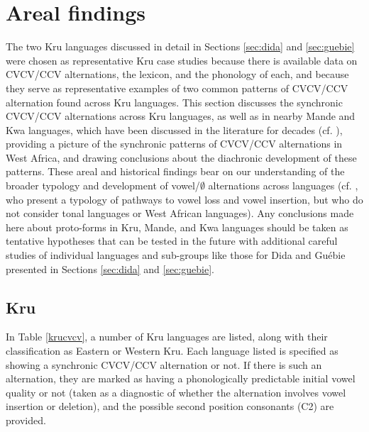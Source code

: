 \documentclass[output=paper,colorlinks,citecolor=brown]{langscibook}
\begin{document}
\section{Areal findings}\label{sec:areal}
The two Kru languages discussed in detail in Sections \ref{sec:dida} and \ref{sec:guebie} were chosen as representative Kru case studies because there is available data on CVCV\slash CCV alternations, the lexicon, and the phonology of each, and because they serve as representative examples of two common patterns of CVCV\slash CCV alternation found across Kru languages. This section discusses the synchronic CVCV\slash CCV alternations across Kru languages, as well as in nearby Mande and Kwa languages, which have been discussed in the literature for decades (cf. \citealt{LeSaout:1974}), providing a picture of the synchronic patterns of CVCV\slash CCV alternations in West Africa, and drawing conclusions about the diachronic development of these patterns. These areal and historical findings bear on our understanding of the broader typology and development of vowel/$\emptyset$ alternations across languages (cf. \cite[40]{Blevins&Pawley}, who present a typology of pathways to vowel loss and vowel insertion, but who do not consider tonal languages or West African languages). Any conclusions made here about proto-forms in Kru, Mande, and Kwa languages should be taken as tentative hypotheses that can be tested in the future with additional careful studies of individual languages and sub-groups like those for Dida and Guébie presented in Sections \ref{sec:dida} and \ref{sec:guebie}.

\subsection{Kru}\label{sec:kru}
In Table \ref{krucvcv}, a number of Kru languages are listed, along with their classification as Eastern or Western Kru. Each language listed is specified as showing a synchronic CVCV\slash CCV alternation or not. If there is such an alternation, they are marked as having a phonologically predictable initial vowel quality or not (taken as a diagnostic of whether the alternation involves vowel insertion or deletion), and the possible second position consonants (C2) are provided.
\end{document}
